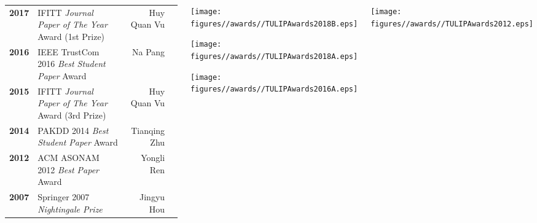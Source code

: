 \documentclass{tikzposter} %
\begin{document}
\begin{columns}
{{\begin{minipage}{\linewidth}
\begin{tabular}{ r | l | r  r }
						\textbf{2017} & IFITT \textit{Journal Paper of The Year} Award (1st Prize) & Huy Quan Vu &  \\
						
						\textbf{2016} & IEEE TrustCom 2016 \textit{Best Student Paper} Award & Na Pang &  \\
						
						\textbf{2015} & IFITT \textit{Journal Paper of The Year} Award (3rd Prize) & Huy Quan Vu &  \\
						
						\textbf{2014} & PAKDD 2014 \textit{Best Student Paper} Award & Tianqing Zhu &  \\
						
						\textbf{2012} & ACM ASONAM 2012  \textit{Best Paper} Award & Yongli Ren &  \\
						
						\textbf{2007} & Springer 2007 \textit{Nightingale Prize} & Jingyu Hou &  \\
						\bottomrule
					\end{tabular}
				\end{minipage}
			}
			
			\vspace{0.9cm}
		
			\begin{minipage}{\linewidth}
				\begin{multicols}{3}
				\centering
				\begin{minipage}{\linewidth}
					\centering
					\texttt{[image: figures//awards//TULIPAwards2018B.eps]}
				\end{minipage}
				
				\begin{minipage}{\linewidth}
					\texttt{[image: figures//awards//TULIPAwards2018A.eps]}
				\end{minipage}	
				
				\begin{minipage}{\linewidth}
					\texttt{[image: figures//awards//TULIPAwards2016A.eps]}
				\end{minipage}				
				\end{multicols}
			\end{minipage}
			
			\vspace{0.6cm}
						
			\begin{minipage}{\linewidth}
				\begin{multicols}{3}
				\centering
				\begin{minipage}{\linewidth}
					\centering
					\texttt{[image: figures//awards//TULIPAwards2012.eps]}
				\end{minipage}
				

\end{multicols}
\end{minipage}}
\end{columns}
\end{document}
